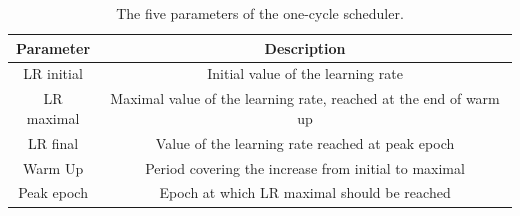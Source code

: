 \begin{table}[h]
  \begin{center}
      \begin{tabular}{c|c} 
      	 \hline \hline
          Parameter   & Description \\ \hline
          LR initial  & Initial value of the learning rate   \\ 
          LR maximal  & Maximal value of the learning rate, reached at the end of warm up   \\ 
          LR final    & Value of the learning rate reached at peak epoch    \\ 
          Warm Up     & Period covering the increase from initial to maximal   \\ 
          Peak epoch  & Epoch at which LR maximal should be reached   \\ \hline \hline
      \end{tabular}
    \caption{The five parameters of the one-cycle scheduler.}
    \label{tab:onecyclescheduler}
  \end{center}
\end{table}

